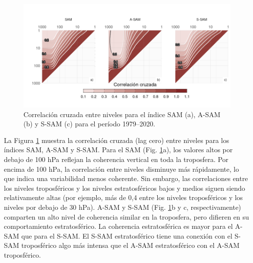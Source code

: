 \documentclass[12pt,oneside,a4paper]{reedthesis}
\begin{document}
\begin{figure}

{\centering \includegraphics{figures/30-sam/cross-correlation-1} 

}

\caption{Correlación cruzada entre niveles para el índice SAM (a), A-SAM (b) y S-SAM (c) para el período 1979--2020.}\label{fig:cross-correlation}
\end{figure}

La Figura \ref{fig:cross-correlation} muestra la correlación cruzada (lag cero) entre niveles para los índices SAM, A-SAM y S-SAM.
Para el SAM (Fig. \ref{fig:cross-correlation}a), los valores altos por debajo de 100 hPa reflejan la coherencia vertical en toda la troposfera.
Por encima de 100 hPa, la correlación entre niveles disminuye más rápidamente, lo que indica una variabilidad menos coherente.
Sin embargo, las correlaciones entre los niveles troposféricos y los niveles estratosféricos bajos y medios siguen siendo relativamente altas (por ejemplo, más de 0,4 entre los niveles troposféricos y los niveles por debajo de 30 hPa).
A-SAM y S-SAM (Fig. \ref{fig:cross-correlation}b y c, respectivamente) comparten un alto nivel de coherencia similar en la troposfera, pero difieren en su comportamiento estratosférico.
La coherencia estratosférica es mayor para el A-SAM que para el S-SAM.
El S-SAM estratosférico tiene una conexión con el S-SAM troposférico algo más intensa que el A-SAM estratosférico con el A-SAM troposférico.
\end{document}
